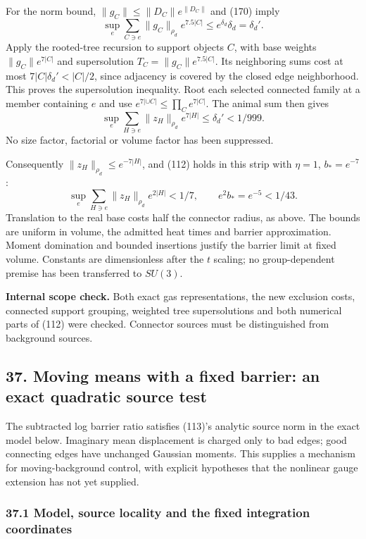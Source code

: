 \documentclass[11pt,a4paper]{article}
\begin{document}
For the norm bound, \(\|g_C\|\le\|D_C\|e^{\|D_C\|}\) and (170) imply
\[\sup_e\sum_{C\ni e}\|g_C\|_{\rho_d}e^{7.5|C|}
 \le e^{\delta_d}\delta_d=\delta_d'.\] Apply the rooted-tree recursion
to support objects \(C\), with base weights \(\|g_C\|e^{7|C|}\) and
supersolution \(T_C=\|g_C\|e^{7.5|C|}\). Its neighboring sums cost at
most \(7|C|\delta_d'<|C|/2\), since adjacency is covered by the closed
edge neighborhood. This proves the supersolution inequality. Root each
selected connected family at a member containing \(e\) and use
\(e^{7|\cup C|}\le\prod_C e^{7|C|}\). The animal sum then gives
\[\sup_e\sum_{H\ni e}\|z_H\|_{\rho_d}e^{7|H|}
 \le\delta_d'<1/999.\tag{172}\] No size factor, factorial or volume
factor has been suppressed.

Consequently \(\|z_H\|_{\rho_d}\le e^{-7|H|}\), and (112) holds in this
strip with \(\eta=1\), \(b_*=e^{-7}\):
\[\sup_e\sum_{H\ni e}\|z_H\|_{\rho_d}e^{2|H|}<1/7,
\qquad e^2b_*=e^{-5}<1/43.\] Translation to the real base costs half the
connector radius, as above. The bounds are uniform in volume, the
admitted heat times and barrier approximation. Moment domination and
bounded insertions justify the barrier limit at fixed volume. Constants
are dimensionless after the \(t\) scaling; no group-dependent premise
has been transferred to \(SU(3)\).

\textbf{Internal scope check.} Both exact gas representations, the new
exclusion costs, connected support grouping, weighted tree
supersolutions and both numerical parts of (112) were checked. Connector
sources must be distinguished from background sources.

\hypertarget{moving-means-with-a-fixed-barrier-an-exact-quadratic-source-test}{%
\subsection{37. Moving means with a fixed barrier: an exact quadratic
source
test}\label{moving-means-with-a-fixed-barrier-an-exact-quadratic-source-test}}

The subtracted log barrier ratio satisfies (113)'s analytic source norm
in the exact model below. Imaginary mean displacement is charged only to
bad edges; good connecting edges have unchanged Gaussian moments. This
supplies a mechanism for moving-background control, with explicit
hypotheses that the nonlinear gauge extension has not yet supplied.

\hypertarget{model-source-locality-and-the-fixed-integration-coordinates}{%
\subsubsection{37.1 Model, source locality and the fixed integration
coordinates}\label{model-source-locality-and-the-fixed-integration-coordinates}}
\end{document}
